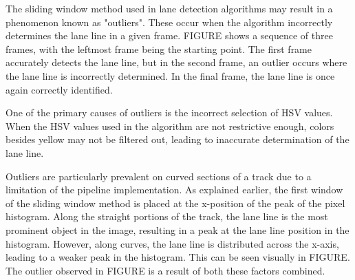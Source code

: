 \documentclass[arbeit=studie,oneside,BCOR=12mm]{ArbeitRST}
\begin{document}
\iffalse

A side effect of the sliding window method is a phenomenom termed "outliers".
Outliers are any frame where the lane line is incorrectely determined. In
FIGURE, a sequence of three frames with an outlier are observed with the left
frame being the start. In the first frame, the lane line is correctly
determined. In the second frame, the lane line is incorrectly determined. In
the last frame, the lane line is once again correctly determined. The incorrect
selection of HSV values is the largest contributor to the occurence of
outliers. When the HSV values are not restrictive enough, colors besides yellow
are not filtered out of the image. Which leads to incorrect determination of
the lane line.

Outliers are most common on the curves of the track, due a disadvantage of the
pipeline implementation. As discussed previously, the first window of the
sliding window method is selected at the x-position of the peak of the pixel
histogram. Along the straight part of the track, the lane line is the densest
object in the image. Therefore the peak of the histogram will be along the lane
line. Along the curves, the lane line will be spread across the x-axis leading
to a reduced peak in the histogram. A visual representation can be seen in
FIGURE. A combination of the two previous factors led to the outlier seen in
FIGURE.

\fi

The sliding window method used in lane detection algorithms may result in a
phenomenon known as "outliers". These occur when the algorithm incorrectly
determines the lane line in a given frame. FIGURE shows a sequence of three
frames, with the leftmost frame being the starting point. The first frame
accurately detects the lane line, but in the second frame, an outlier occurs
where the lane line is incorrectly determined. In the final frame, the lane
line is once again correctly identified.

One of the primary causes of outliers is the incorrect selection of HSV values.
When the HSV values used in the algorithm are not restrictive enough, colors
besides yellow may not be filtered out, leading to inaccurate determination of
the lane line.

Outliers are particularly prevalent on curved sections of a track due to a
limitation of the pipeline implementation. As explained earlier, the first
window of the sliding window method is placed at the x-position of the peak of
the pixel histogram. Along the straight portions of the track, the lane line is
the most prominent object in the image, resulting in a peak at the lane line
position in the histogram. However, along curves, the lane line is distributed
across the x-axis, leading to a weaker peak in the histogram. This can be seen
visually in FIGURE. The outlier observed in FIGURE is a result of both
these factors combined.
\end{document}
